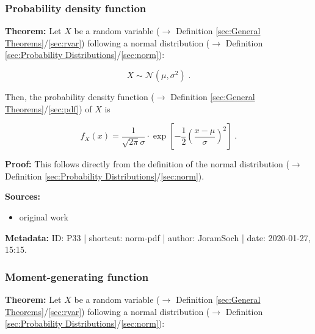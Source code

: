 \documentclass[a4paper,12pt,twoside]{book}
\begin{document}
\subsubsection[\textbf{Probability density function}]{Probability density function} \label{sec:norm-pdf}
\setcounter{equation}{0}

\textbf{Theorem:} Let $X$ be a random variable ($\rightarrow$ Definition \ref{sec:General Theorems}/\ref{sec:rvar}) following a normal distribution ($\rightarrow$ Definition \ref{sec:Probability Distributions}/\ref{sec:norm}):

\begin{equation} \label{eq:norm-pdf-norm}
X \sim \mathcal{N}(\mu, \sigma^2) \; .
\end{equation}

Then, the probability density function ($\rightarrow$ Definition \ref{sec:General Theorems}/\ref{sec:pdf}) of $X$ is

\begin{equation} \label{eq:norm-pdf-norm-pdf}
f_X(x) = \frac{1}{\sqrt{2 \pi} \sigma} \cdot \exp \left[ -\frac{1}{2} \left( \frac{x-\mu}{\sigma} \right)^2 \right] \; .
\end{equation}


\vspace{1em}
\textbf{Proof:} This follows directly from the definition of the normal distribution ($\rightarrow$ Definition \ref{sec:Probability Distributions}/\ref{sec:norm}).


\vspace{1em}
\textbf{Sources:}
\begin{itemize}
\item original work\end{itemize}


\vspace{1em}
\textbf{Metadata:} ID: P33 | shortcut: norm-pdf | author: JoramSoch | date: 2020-01-27, 15:15.
\vspace{1em}



\subsubsection[\textbf{Moment-generating function}]{Moment-generating function} \label{sec:norm-mgf}
\setcounter{equation}{0}

\textbf{Theorem:} Let $X$ be a random variable ($\rightarrow$ Definition \ref{sec:General Theorems}/\ref{sec:rvar}) following a normal distribution ($\rightarrow$ Definition \ref{sec:Probability Distributions}/\ref{sec:norm}):
\end{document}
